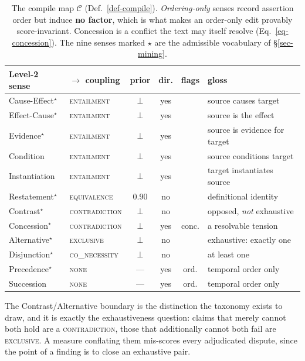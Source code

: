 \documentclass{article} %
\newcommand{\coupling}[1]{\textsc{#1}}          %
\newcommand{\sense}[1]{\textsf{#1}}             %
\begin{document}
\begin{table}[t]
\centering\small
\caption{The compile map $\mathcal{C}$ (Def.~\ref{def-compile}). \emph{Ordering-only} senses
  record assertion order but induce \textbf{no factor}, which is what makes an order-only edit
  provably score-invariant. \sense{Concession} is a conflict the text may itself resolve
  (Eq.~\ref{eq-concession}). The nine senses marked $\star$ are the admissible vocabulary of
  \S\ref{sec-mining}.}
\label{tab:compile}
\begin{tabular}{@{}llcccl@{}}
\toprule
Level-2 sense & $\to$ coupling & prior & dir. & flags & gloss \\
\midrule
\sense{Cause-Effect}$^\star$   & \coupling{entailment}    & $\bot$ & yes & & source causes target \\
\sense{Effect-Cause}$^\star$   & \coupling{entailment}    & $\bot$ & yes & & source is the effect \\
\sense{Evidence}$^\star$       & \coupling{entailment}    & $\bot$ & yes & & source is evidence for target \\
\sense{Condition}              & \coupling{entailment}    & $\bot$ & yes & & source conditions target \\
\sense{Instantiation}          & \coupling{entailment}    & $\bot$ & yes & & target instantiates source \\
\sense{Restatement}$^\star$    & \coupling{equivalence}   & $0.90$ & no  & & definitional identity \\
\sense{Contrast}$^\star$       & \coupling{contradiction} & $\bot$ & no  & & opposed, \emph{not} exhaustive \\
\sense{Concession}$^\star$     & \coupling{contradiction} & $\bot$ & yes & conc. & a resolvable tension \\
\sense{Alternative}$^\star$    & \coupling{exclusive}     & $\bot$ & no  & & exhaustive: exactly one \\
\sense{Disjunction}$^\star$    & \coupling{co\_necessity} & $\bot$ & no  & & at least one \\
\sense{Precedence}$^\star$     & \coupling{none}          & ---    & yes & ord. & temporal order only \\
\sense{Succession}             & \coupling{none}          & ---    & yes & ord. & temporal order only \\
\bottomrule
\end{tabular}
\end{table}

The \sense{Contrast}/\sense{Alternative} boundary is the distinction the taxonomy exists to draw,
and it is exactly the exhaustiveness question: claims that merely cannot both hold are a
\coupling{contradiction}, those that additionally cannot both fail are \coupling{exclusive}. A
measure conflating them mis-scores every adjudicated dispute, since the point of a finding is to
close an exhaustive pair.
\end{document}
